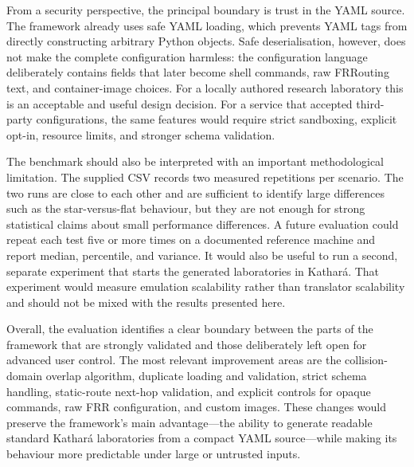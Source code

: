 From a security perspective, the principal boundary is trust in the YAML
source. The framework already uses safe YAML loading, which prevents YAML tags
from directly constructing arbitrary Python objects. Safe deserialisation,
however, does not make the complete configuration harmless: the configuration
language deliberately contains fields that later become shell commands, raw
FRRouting text, and container-image choices. For a locally authored research
laboratory this is an acceptable and useful design decision. For a service
that accepted third-party configurations, the same features would require
strict sandboxing, explicit opt-in, resource limits, and stronger schema
validation.

The benchmark should also be interpreted with an important methodological
limitation. The supplied CSV records two measured repetitions per scenario.
The two runs are close to each other and are sufficient to identify large
differences such as the star-versus-flat behaviour, but they are not enough for
strong statistical claims about small performance differences. A future
evaluation could repeat each test five or more times on a documented reference
machine and report median, percentile, and variance. It would also be useful
to run a second, separate experiment that starts the generated laboratories in
Kathar\'a. That experiment would measure emulation scalability rather than
translator scalability and should not be mixed with the results presented
here.

Overall, the evaluation identifies a clear boundary between the parts of the
framework that are strongly validated and those deliberately left open for
advanced user control. The most relevant improvement areas are the
collision-domain overlap algorithm, duplicate loading and validation, strict
schema handling, static-route next-hop validation, and explicit controls for
opaque commands, raw FRR configuration, and custom images. These changes would
preserve the framework's main advantage---the ability to generate readable
standard Kathar\'a laboratories from a compact YAML source---while making its
behaviour more predictable under large or untrusted inputs.
